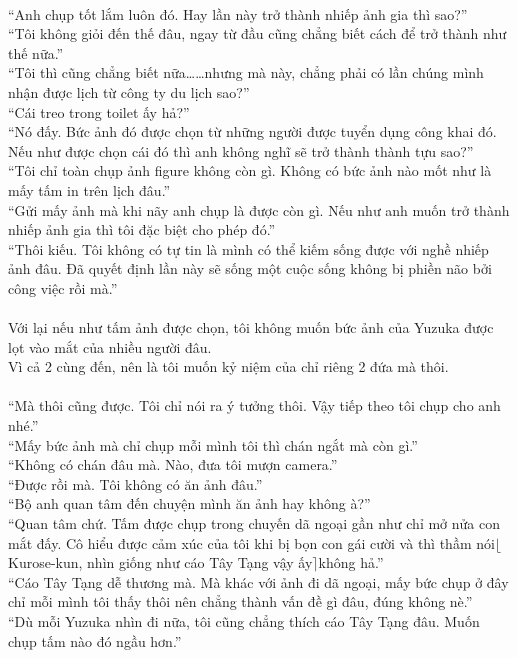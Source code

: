 \documentclass[12pt,a4paper, twosides]{book}
\begin{document}
\\
“Anh chụp tốt lắm luôn đó. Hay lần này trở thành nhiếp ảnh gia thì sao?”\\
“Tôi không giỏi đến thế đâu, ngay từ đầu cũng chẳng biết cách để trở thành như thế nữa.”\\
“Tôi thì cũng chẳng biết nữa……nhưng mà này, chẳng phải có lần chúng mình nhận được lịch từ công ty du lịch sao?”\\
“Cái treo trong toilet ấy hả?”\\
“Nó đấy. Bức ảnh đó được chọn từ những người được tuyển dụng công khai đó. Nếu như được chọn cái đó thì anh không nghĩ sẽ trở thành thành tựu sao?”\\
“Tôi chỉ toàn chụp ảnh figure không còn gì. Không có bức ảnh nào mốt như là mấy tấm in trên lịch đâu.”\\
“Gửi mấy ảnh mà khi nãy anh chụp là được còn gì. Nếu như anh muốn trở thành nhiếp ảnh gia thì tôi đặc biệt cho phép đó.”\\
“Thôi kiếu. Tôi không có tự tin là mình có thể kiếm sống được với nghề nhiếp ảnh đâu. Đã quyết định lần này sẽ sống một cuộc sống không bị phiền não bởi công việc rồi mà.”\\
\\
Với lại nếu như tấm ảnh được chọn, tôi không muốn bức ảnh của Yuzuka được lọt vào mắt của nhiều người đâu.\\
Vì cả 2 cùng đến, nên là tôi muốn kỷ niệm của chỉ riêng 2 đứa mà thôi.\\
\\
“Mà thôi cũng được. Tôi chỉ nói ra ý tưởng thôi. Vậy tiếp theo tôi chụp cho anh nhé.”\\
“Mấy bức ảnh mà chỉ chụp mỗi mình tôi thì chán ngắt mà còn gì.”\\
“Không có chán đâu mà. Nào, đưa tôi mượn camera.”\\
“Được rồi mà. Tôi không có ăn ảnh đâu.”\\
“Bộ anh quan tâm đến chuyện mình ăn ảnh hay không à?”\\
“Quan tâm chứ. Tấm được chụp trong chuyến dã ngoại gần như chỉ mở nửa con mắt đấy. Cô hiểu được cảm xúc của tôi khi bị bọn con gái cười và thì thầm nói$\lfloor$Kurose-kun, nhìn giống như cáo Tây Tạng vậy ấy$\rceil$không hả.”\\
“Cáo Tây Tạng dễ thương mà. Mà khác với ảnh đi dã ngoại, mấy bức chụp ở đây chỉ mỗi mình tôi thấy thôi nên chẳng thành vấn đề gì đâu, đúng không nè.”\\
“Dù mỗi Yuzuka nhìn đi nữa, tôi cũng chẳng thích cáo Tây Tạng đâu. Muốn chụp tấm nào đó ngầu hơn.”\\
\end{document}

